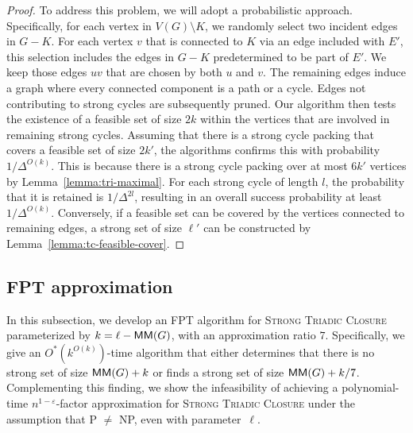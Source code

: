 \begin{proof}
  To address this problem, we will adopt a probabilistic approach.
  Specifically, for each vertex in $V(G) \setminus K$, we randomly select two incident edges in $G - K$.
  For each vertex $v$ that is connected to $K$ via an edge included with $E'$, this selection includes the edges in $G - K$ predetermined to be part of $E'$.
  We keep those edges $uv$ that are chosen by both $u$ and $v$.
  The remaining edges induce a graph where every connected component is a path or a cycle.
  Edges not contributing to strong cycles are subsequently pruned.
  Our algorithm then tests the existence of a feasible set of size $2k$ within the vertices that are involved in remaining strong cycles.
  Assuming that there is a strong cycle packing that covers a feasible set of size $2k'$, the algorithms confirms this with probability $1/\Delta^{O(k)}$.
  This is because there is a strong cycle packing over at most $6k'$ vertices by Lemma~\ref{lemma:tri-maximal}.
  For each strong cycle of length $l$, the probability that it is retained is $1/\Delta^{2l}$, resulting in an overall success probability at least $1/\Delta^{O(k)}$.
  Conversely, if a feasible set can be covered by the vertices connected to remaining edges, a strong set of size $\ell'$ can be constructed by Lemma~\ref{lemma:tc-feasible-cover}.
\end{proof}

\subsection{FPT approximation}\label{ssec:STC_FPT_Approx}

In this subsection, we develop an FPT algorithm for \textsc{Strong Triadic Closure} parameterized by $k = \ell - \mathsf{MM}(G)$, with an approximation ratio $7$.
Specifically, we give an $O^*(k^{O(k)})$-time algorithm that either determines that there is no strong set of size $\mathsf{MM}(G) + k$ or finds a strong set of size $\mathsf{MM}(G) + k/7$.
Complementing this finding, we show the infeasibility of achieving a polynomial-time $n^{1-\varepsilon}$-factor approximation for \textsc{Strong Triadic Closure} under the assumption that P $\ne$ NP, even with parameter~$\ell$.

\tcamapprox*

